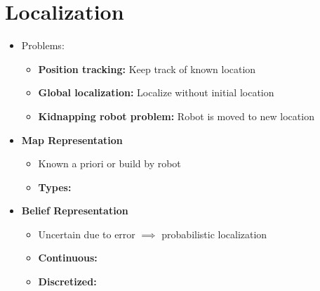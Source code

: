 \documentclass[a4paper]{article}
\newcommand{\ides}[1]{\item \textbf{#1}}
\begin{document}

\section{Localization}
\begin{itemize}
    \item Problems:
        \begin{itemize}
            \ides{Position tracking:} Keep track of known location
            \ides{Global localization:} Localize without initial location
            \ides{Kidnapping robot problem:} Robot is moved to new location
        \end{itemize}
    \ides{Map Representation}
        \begin{itemize}
            \item Known a priori or build by robot
            \ides{Types:}
        \end{itemize}
    \ides{Belief Representation}
        \begin{itemize}
            \item Uncertain due to error $\implies$ probabilistic localization
            \ides{Continuous:}
            \ides{Discretized:}

\end{itemize}
\end{itemize}
\end{document}
